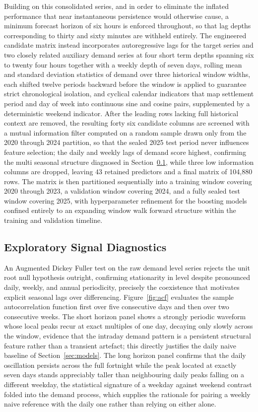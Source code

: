 \documentclass[runningheads]{llncs}
\begin{document}
Building on this consolidated series, and in order to eliminate the inflated performance that near instantaneous persistence would otherwise cause, a minimum forecast horizon of six hours is enforced throughout, so that lag depths corresponding to thirty and sixty minutes are withheld entirely. The engineered candidate matrix instead incorporates autoregressive lags for the target series and two closely related auxiliary demand series at four short term depths spanning six to twenty four hours together with a weekly depth of seven days, rolling mean and standard deviation statistics of demand over three historical window widths, each shifted twelve periods backward before the window is applied to guarantee strict chronological isolation, and cyclical calendar indicators that map settlement period and day of week into continuous sine and cosine pairs, supplemented by a deterministic weekend indicator. After the leading rows lacking full historical context are removed, the resulting forty six candidate columns are screened with a mutual information filter computed on a random sample drawn only from the 2020 through 2024 partition, so that the sealed 2025 test period never influences feature selection; the daily and weekly lags of demand score highest, confirming the multi seasonal structure diagnosed in Section~\ref{sec:eda}, while three low information columns are dropped, leaving 43 retained predictors and a final matrix of 104{,}880 rows. The matrix is then partitioned sequentially into a training window covering 2020 through 2023, a validation window covering 2024, and a fully sealed test window covering 2025, with hyperparameter refinement for the boosting models confined entirely to an expanding window walk forward structure within the training and validation timeline.

\subsection{Exploratory Signal Diagnostics}
\label{sec:eda}


An Augmented Dickey Fuller test on the raw demand level series rejects the unit root null hypothesis outright, confirming stationarity in level despite pronounced daily, weekly, and annual periodicity, precisely the coexistence that motivates explicit seasonal lags over differencing. Figure~\ref{fig:acf} evaluates the sample autocorrelation function first over five consecutive days and then over two consecutive weeks. The short horizon panel shows a strongly periodic waveform whose local peaks recur at exact multiples of one day, decaying only slowly across the window, evidence that the intraday demand pattern is a persistent structural feature rather than a transient artefact; this directly justifies the daily naive baseline of Section~\ref{sec:models}. The long horizon panel confirms that the daily oscillation persists across the full fortnight while the peak located at exactly seven days stands appreciably taller than neighbouring daily peaks falling on a different weekday, the statistical signature of a weekday against weekend contrast folded into the demand process, which supplies the rationale for pairing a weekly naive reference with the daily one rather than relying on either alone.
\end{document}
